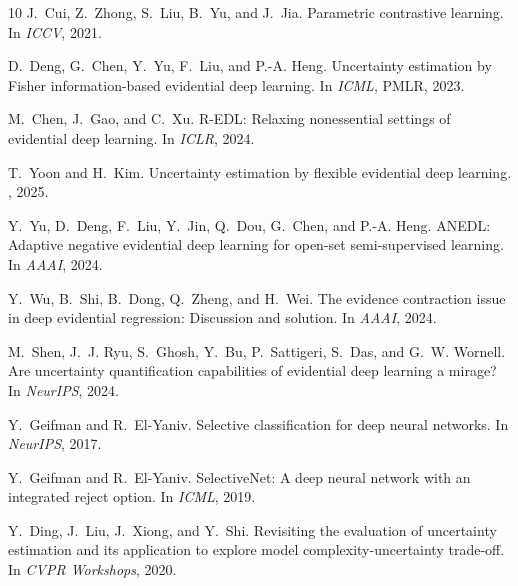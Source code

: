 \documentclass[letterpaper]{article} %
\begin{document}
\begin{thebibliography}{10}
J.~Cui, Z.~Zhong, S.~Liu, B.~Yu, and J.~Jia.
\newblock Parametric contrastive learning.
\newblock In {\em ICCV}, 2021.

D.~Deng, G.~Chen, Y.~Yu, F.~Liu, and P.-A. Heng.
\newblock Uncertainty estimation by Fisher information-based evidential deep learning.
\newblock In {\em ICML}, PMLR, 2023.

M.~Chen, J.~Gao, and C.~Xu.
\newblock R-EDL: Relaxing nonessential settings of evidential deep learning.
\newblock In {\em ICLR}, 2024.

T.~Yoon and H.~Kim.
\newblock Uncertainty estimation by flexible evidential deep learning.
, 2025.

Y.~Yu, D.~Deng, F.~Liu, Y.~Jin, Q.~Dou, G.~Chen, and P.-A. Heng.
\newblock ANEDL: Adaptive negative evidential deep learning for open-set semi-supervised learning.
\newblock In {\em AAAI}, 2024.

Y.~Wu, B.~Shi, B.~Dong, Q.~Zheng, and H.~Wei.
\newblock The evidence contraction issue in deep evidential regression: Discussion and solution.
\newblock In {\em AAAI}, 2024.

M.~Shen, J.~J. Ryu, S.~Ghosh, Y.~Bu, P.~Sattigeri, S.~Das, and G.~W. Wornell.
\newblock Are uncertainty quantification capabilities of evidential deep learning a mirage?
\newblock In {\em NeurIPS}, 2024.

Y.~Geifman and R.~El-Yaniv.
\newblock Selective classification for deep neural networks.
\newblock In {\em NeurIPS}, 2017.

Y.~Geifman and R.~El-Yaniv.
\newblock SelectiveNet: A deep neural network with an integrated reject option.
\newblock In {\em ICML}, 2019.

Y.~Ding, J.~Liu, J.~Xiong, and Y.~Shi.
\newblock Revisiting the evaluation of uncertainty estimation and its application to explore model complexity-uncertainty trade-off.
\newblock In {\em CVPR Workshops}, 2020.


\end{thebibliography}
\end{document}
